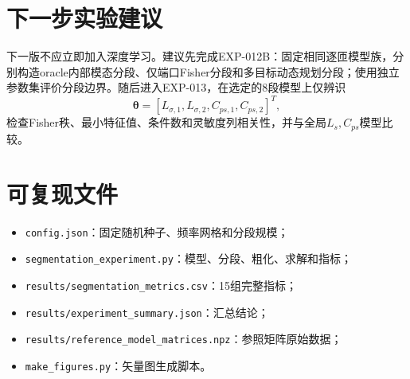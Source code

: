 \documentclass[UTF8,12pt,a4paper]{ctexart}
\begin{document}
\section{下一步实验建议}
下一版不应立即加入深度学习。建议先完成EXP-012B：固定相同逐匝模型族，分别构造oracle内部模态分段、仅端口Fisher分段和多目标动态规划分段；使用独立参数集评价分段边界。随后进入EXP-013，在选定的8段模型上仅辨识
\[
\bm\theta=[L_{\sigma,1},L_{\sigma,2},C_{ps,1},C_{ps,2}]^T,
\]
检查Fisher秩、最小特征值、条件数和灵敏度列相关性，并与全局$L_s,C_{ps}$模型比较。

\appendix
\section{可复现文件}
\begin{itemize}
\item \texttt{config.json}：固定随机种子、频率网格和分段规模；
\item \texttt{segmentation\_experiment.py}：模型、分段、粗化、求解和指标；
\item \texttt{results/segmentation\_metrics.csv}：15组完整指标；
\item \texttt{results/experiment\_summary.json}：汇总结论；
\item \texttt{results/reference\_model\_matrices.npz}：参照矩阵原始数据；
\item \texttt{make\_figures.py}：矢量图生成脚本。
\end{itemize}
\end{document}
